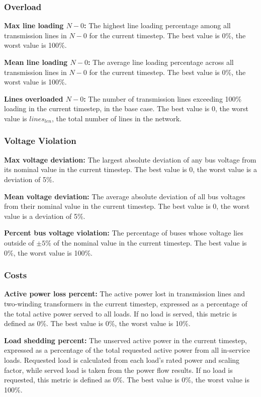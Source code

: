 \subsubsection{Overload}

\textbf{Max line loading $N-0$:} The highest line loading percentage among all transmission lines in $N-0$ for the current timestep. The best value is 0\%, the worst value is 100\%.

\textbf{Mean line loading $N-0$:} The average line loading percentage across all transmission lines in $N-0$ for the current timestep. The best value is 0\%, the worst value is 100\%.

\textbf{Lines overloaded $N-0$:} The number of transmission lines exceeding 100\% loading in the current timestep, in the base case. The best value is 0, the worst value is $lines_{len}$, the total number of lines in the network.

\subsubsection{Voltage Violation}

\textbf{Max voltage deviation:} The largest absolute deviation of any bus voltage from its nominal value in the current timestep. The best value is 0, the worst value is a deviation of 5\%.

\textbf{Mean voltage deviation:} The average absolute deviation of all bus voltages from their nominal value in the current timestep. The best value is 0, the worst value is a deviation of 5\%.

\textbf{Percent bus voltage violation:} The percentage of buses whose voltage lies outside of $\pm5\%$ of the nominal value in the current timestep. The best value is 0\%, the worst value is 100\%.

\subsubsection{Costs}

\textbf{Active power loss percent:} The active power lost in transmission lines and two-winding transformers in the current timestep, expressed as a percentage of the total active power served to all loads. If no load is served, this metric is defined as 0\%. The best value is 0\%, the worst value is 10\%.

\textbf{Load shedding percent:} The unserved active power in the current timestep, expressed as a percentage of the total requested active power from all in-service loads. Requested load is calculated from each load's rated power and scaling factor, while served load is taken from the power flow results. If no load is requested, this metric is defined as 0\%. The best value is 0\%, the worst value is 100\%.




